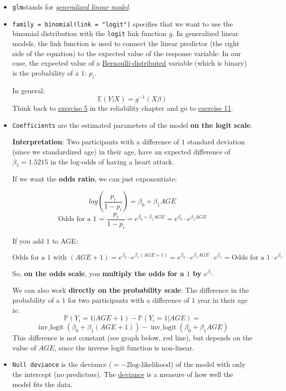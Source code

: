 \documentclass[
]{article}
\begin{document}
\begin{itemize}
\item
  \texttt{glm}stands for
  \href{https://en.wikipedia.org/wiki/Generalized_linear_model}{\emph{generalized
  linear model}}.
\item
  \texttt{family\ =\ binomial(link\ =\ "logit")} specifies that we want
  to use the binomial distribution with the \texttt{logit} link function
  \(g\). In generalized linear models, the link function is used to
  connect the linear predictor (the right side of the equation) to the
  expected value of the response variable: In our case, the expected
  value of a
  \href{https://en.wikipedia.org/wiki/Bernoulli_distribution\#:~:text=The\%20Bernoulli\%20distribution\%20is\%20a,not\%20be\%200\%20and\%201.}{Bernoulli-distributed}
  variable (which is binary) is the probability of a \(1\): \(p_i\).

  In general: \[\mathbb{E}(Y|X) = g^{-1}(X \beta)\] Think back to
  \href{https://jdegenfellner.github.io/Script_QM3_ZHAW/further-regression-methods.html\#exercise5_LMM}{exercise
  5} in the reliability chapter and go to \href{exercise11_LMM}{exercise
  11}.
\item
  \texttt{Coefficients} are the estimated parameters of the model
  \textbf{on the logit scale}.

  \textbf{Interpretation}: Two participants with a difference of \(1\)
  standard deviation (since we standardized age) in their age, have an
  expected difference of \(\beta_1 = 1.5215\) in the log-odds of having
  a heart attack.

  If we want the \textbf{odds ratio}, we can just exponentiate:

  \[log(\frac{p_i}{1-p_i}) = \beta_0 + \beta_1 AGE\]
  \[\text{Odds for a 1 = } \frac{p_i}{1-p_i} = e^{\beta_0 + \beta_1 AGE} = e^{\beta_0} \cdot e^{\beta_1 AGE}\]

  If you add \(1\) to AGE:

  \[\text{Odds for a 1 with } (AGE + 1) = e^{\beta_0} \cdot e^{\beta_1 (AGE + 1)} = e^{\beta_0} \cdot e^{\beta_1 AGE} \cdot e^{\beta_1} = \text{Odds for a 1} \cdot e^{\beta_1}\]

  So, \textbf{on the odds scale}, you \textbf{multiply the odds for a
  \(1\) by \(e^{\beta_1}\)}.

  We can also work \textbf{directly on the probability scale}: The
  difference in the probability of a \(1\) for two participants with a
  difference of \(1\) year in their age is:
  \[\mathbb{P}(Y_i = 1 | AGE + 1) - \mathbb{P}(Y_i = 1 | AGE) =\]
  \[\operatorname{inv\_logit}(\beta_0 + \beta_1 (AGE + 1)) - \operatorname{inv\_logit}(\beta_0 + \beta_1 AGE)\]
  This difference is not constant (see graph below, red line), but
  depends on the value of \(AGE\), since the inverse logit function is
  non-linear.
\item
  \texttt{Null\ deviance} is the deviance
  (\(= -2 \text{log-likelihood}\)) of the model with only the intercept
  (no predictors). The
  \href{https://en.wikipedia.org/wiki/Deviance_(statistics)}{deviance}
  is a measure of how well the model fits the data.


\end{itemize}
\end{document}
